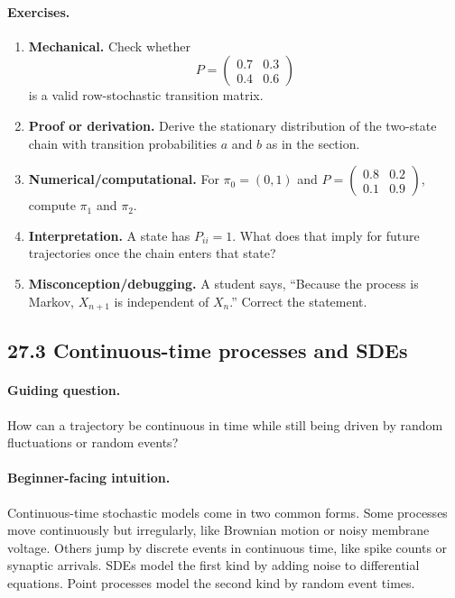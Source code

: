 \paragraph{Exercises.}
\begin{enumerate}[label=\textbf{27.2.\arabic*.}, leftmargin=*]
\item \textbf{Mechanical.} Check whether
\[
P=\begin{pmatrix}0.7&0.3\\0.4&0.6\end{pmatrix}
\]
is a valid row-stochastic transition matrix.
\item \textbf{Proof or derivation.} Derive the stationary distribution of the two-state chain with transition probabilities \(a\) and \(b\) as in the section.
\item \textbf{Numerical/computational.} For \(\pi_0=(0,1)\) and \(P=\begin{pmatrix}0.8&0.2\\0.1&0.9\end{pmatrix}\), compute \(\pi_1\) and \(\pi_2\).
\item \textbf{Interpretation.} A state has \(P_{ii}=1\). What does that imply for future trajectories once the chain enters that state?
\item \textbf{Misconception/debugging.} A student says, ``Because the process is Markov, \(X_{n+1}\) is independent of \(X_n\).'' Correct the statement.
\end{enumerate}

\subsection{27.3 Continuous-time processes and SDEs}

\paragraph{Guiding question.}
How can a trajectory be continuous in time while still being driven by random fluctuations or random events?

\paragraph{Beginner-facing intuition.}
Continuous-time stochastic models come in two common forms. Some processes move continuously but irregularly, like Brownian motion or noisy membrane voltage. Others jump by discrete events in continuous time, like spike counts or synaptic arrivals. SDEs model the first kind by adding noise to differential equations. Point processes model the second kind by random event times.

